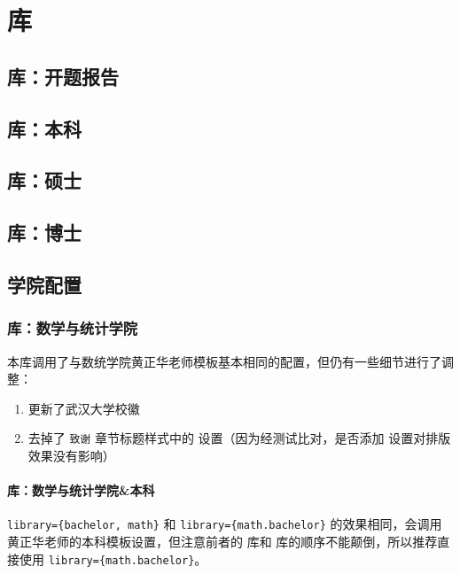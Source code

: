 
\chapter{库}

\section{ 库：开题报告}


\section{ 库：本科}


\section{ 库：硕士}


\section{ 库：博士}


\section{学院配置}

\subsection{ 库：数学与统计学院}

本库调用了与数统学院黄正华老师模板基本相同的配置，但仍有一些细节进行了调整：

\begin{enumerate}
  \item 更新了武汉大学校徽\cite{whulogo}
  \item 去掉了 \verb|致谢| 章节标题样式中的  设置（因为经测试比对，是否添加  设置对排版效果没有影响）
\end{enumerate}


\subsubsection{ 库：数学与统计学院\&本科}

\verb|library={bachelor, math}| 和 \verb|library={math.bachelor}| 的效果相同，会调用黄正华老师的本科模板设置，但注意前者的  库和  库的顺序不能颠倒，所以推荐直接使用 \verb|library={math.bachelor}|。

